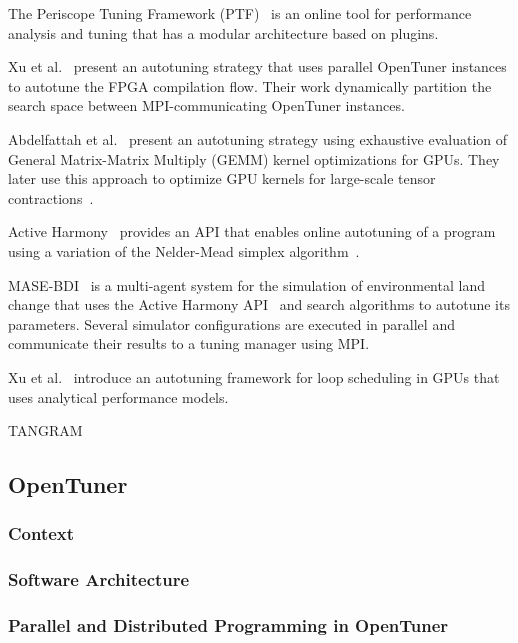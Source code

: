 The Periscope Tuning Framework
(PTF)~\cite{gerndt2005periscope,gerndt2010automatic,gerndt2017multi} is an
online tool for performance analysis and tuning that has a modular architecture
based on plugins.

Xu et al.~\cite{xu2017parallel} present an autotuning strategy that uses
parallel OpenTuner instances to autotune the FPGA compilation flow.  Their work
dynamically partition the search space between MPI-communicating OpenTuner
instances.

Abdelfattah et al.~\cite{abdelfattah2016performance} present an autotuning
strategy using exhaustive evaluation of General Matrix-Matrix Multiply (GEMM)
kernel optimizations for GPUs. They later use this approach to optimize GPU
kernels for large-scale tensor contractions~\cite{abdelfattah2016high}.

Active Harmony~\cite{tapus2002active} provides an API that enables
online autotuning of a program using a variation of the Nelder-Mead
simplex algorithm~\cite{nelder1965simplex}.

MASE-BDI~\cite{coelho2016mase} is a multi-agent system for the simulation of
environmental land change that uses the Active Harmony
API~\cite{tapus2002active} and search algorithms to autotune its parameters.
Several simulator configurations are executed in parallel and communicate their
results to a tuning manager using MPI.

Xu et al.~\cite{xu2016analytical} introduce an autotuning framework for
loop scheduling in GPUs that uses analytical performance models.

TANGRAM~\cite{chang2015tangram,chang2016efficient}

\subsection{OpenTuner}
\label{sec:opentuner}

\subsubsection{Context}
\label{sec:context}

\subsubsection{Software Architecture}
\label{sec:arch}

\subsubsection{Parallel and Distributed Programming in OpenTuner}
\label{sec:opentuner-parallel}

